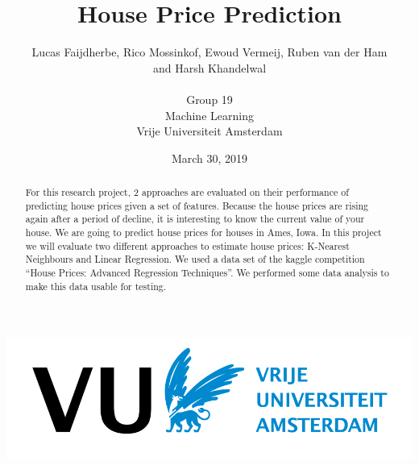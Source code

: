 \documentclass[a4paper,11pt]{article}
\title{House Price Prediction}
\date{March 30, 2019}
\author{Lucas Faijdherbe, Rico Mossinkof, Ewoud Vermeij, Ruben van der Ham\\ and Harsh Khandelwal\\\\
Group 19\\
\small Machine Learning\\
\small Vrije Universiteit Amsterdam}
\begin{document}
\begin{titlepage}

\centering
\maketitle
\includegraphics[width=0.8\linewidth]{images/vulogo.png}

\end{titlepage}
\clearpage





\begin{abstract}
For this research project, 2 approaches are evaluated on their performance of predicting house prices given a set of features. Because the house prices are rising again after a period of decline, it is interesting to know the current value of your house. We are going to predict house prices for houses in Ames, Iowa.
    In this project we will evaluate two different approaches to estimate house prices: K-Nearest Neighbours and Linear Regression. We used a data set of the kaggle competition “House Prices: Advanced Regression Techniques”. We performed some data analysis to make this data usable for testing. 
\end{abstract}
\end{document}
